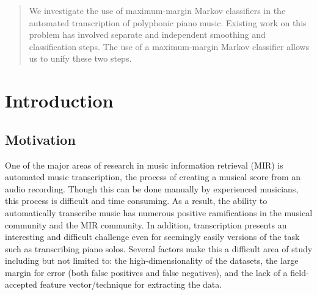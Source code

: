 \documentclass{article}
\begin{document}
 


\begin{abstract} 
We investigate the use of maximum-margin Markov classifiers in the automated
transcription of polyphonic piano music.
Existing work on this problem has involved separate and independent smoothing
and classification steps. The use of a maximum-margin Markov classifier allows
us to unify these two steps.
\end{abstract} 


\section{Introduction}

\subsection{Motivation}
One of the major areas of research in music information retrieval (MIR) is
automated music transcription, the
process of creating a musical score from an audio recording. Though this
can be done manually by experienced musicians, this process is difficult
and time consuming. As a result, the ability to automatically transcribe
music has numerous positive ramifications in the musical community and the
MIR community. In addition, transcription presents an interesting and
difficult challenge even for seemingly easily versions of the task such as
transcribing piano solos. Several factors make this a difficult area of
study including but not limited to: the high-dimensionality of the
datasets, the large margin for error (both false positives and false
negatives), and the lack of a field-accepted feature vector/technique for
extracting the data. 
\end{document}

